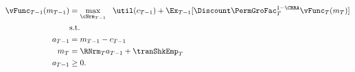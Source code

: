 \begin{equation*}\begin{gathered}\begin{aligned}
{\vFunc}_{T-1}(m_{T-1})  & = \max_{\cNrm_{T-1}} ~~ \util(c_{T-1}) + \Ex_{T-1} [\Discount \PermGroFac_{T}^{1-\CRRA}\vFunc_{T}(m_{T})] \label{eq:ConstrArt}
\\ & \mbox{s.t.}  \nonumber
\\ a_{T-1}  & = m_{T-1} - c_{T-1}
\\ m_{T}  & = \RNrm_{T} a_{T-1} + \tranShkEmp_{T}
\\ a_{T-1} & \geq  0 .
\end{aligned}\end{gathered}\end{equation*}
